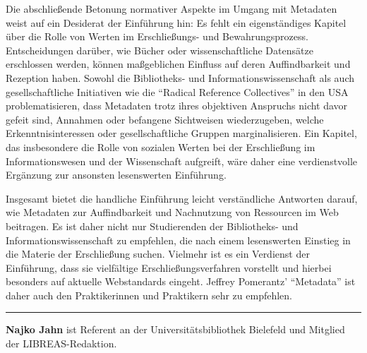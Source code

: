 \documentclass[a4paper,
fontsize=11pt,
oneside,
numbers=noperiodatend,
parskip=half-,
bibliography=totoc,
final
]{scrartcl}
\begin{document}
Die abschließende Betonung normativer Aspekte im Umgang mit Metadaten
weist auf ein Desiderat der Einführung hin: Es fehlt ein eigenständiges
Kapitel über die Rolle von Werten im Erschließungs- und
Bewahrungsprozess. Entscheidungen darüber, wie Bücher oder
wissenschaftliche Datensätze erschlossen werden, können maßgeblichen
Einfluss auf deren Auffindbarkeit und Rezeption haben. Sowohl die
Bibliotheks- und Informationswissenschaft als auch gesellschaftliche
Initiativen wie die \enquote{Radical Reference Collectives} in den USA
problematisieren, dass Metadaten trotz ihres objektiven Anspruchs nicht
davor gefeit sind, Annahmen oder befangene Sichtweisen wiederzugeben,
welche Erkenntnisinteressen oder gesellschaftliche Gruppen
marginalisieren. Ein Kapitel, das insbesondere die Rolle von sozialen
Werten bei der Erschließung im Informationswesen und der Wissenschaft
aufgreift, wäre daher eine verdienstvolle Ergänzung zur ansonsten
lesenswerten Einführung.

Insgesamt bietet die handliche Einführung leicht verständliche Antworten
darauf, wie Metadaten zur Auffindbarkeit und Nachnutzung von Ressourcen
im Web beitragen. Es ist daher nicht nur Studierenden der Bibliotheks-
und Informationswissenschaft zu empfehlen, die nach einem lesenswerten
Einstieg in die Materie der Erschließung suchen. Vielmehr ist es ein
Verdienst der Einführung, dass sie vielfältige Erschließungsverfahren
vorstellt und hierbei besonders auf aktuelle Webstandards eingeht.
Jeffrey Pomerantz' \enquote{Metadata} ist daher auch den Praktikerinnen
und Praktikern sehr zu empfehlen.

\begin{center}\rule{0.5\linewidth}{\linethickness}\end{center}

\textbf{Najko Jahn} ist Referent an der Universitätsbibliothek Bielefeld
und Mitglied der LIBREAS-Redaktion.
\end{document}
